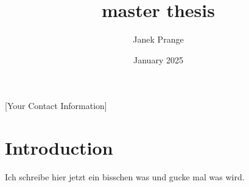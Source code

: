 [Your Contact Information]  \documentclass{article}
\title{master thesis}
\author{Janek Prange}
\date{January 2025}
\begin{document}
\maketitle

\section{Introduction}

Ich schreibe hier jetzt ein bisschen was und gucke mal was wird.
\end{document}
